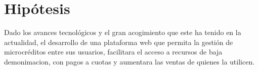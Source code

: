 \section{Hipótesis}

{Dado los avances tecnológicos y el gran acogimiento que este ha tenido en la actualidad, el desarrollo de una plataforma web que permita la gestión de microcréditos entre sus usuarios, facilitara el acceso a recursos de baja demonimacion, con pagos a cuotas y aumentara las ventas de quienes la utilicen.}